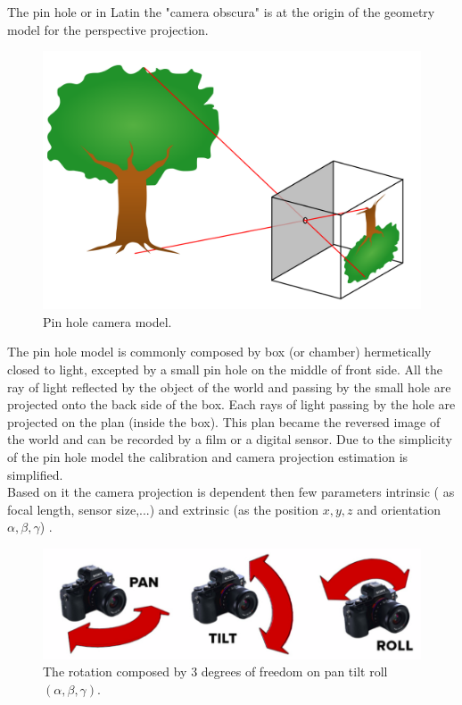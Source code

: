 The pin hole or in Latin the "camera obscura" is at the origin of the geometry model for the perspective projection.\\
\begin{figure}[t!]
\begin{center}
   \includegraphics[width=\linewidth]{img/PinholeCam.png}
  \caption{ Pin hole camera model.}\label{fig:PanTiltRoll}
  \endminipage\hfill
\end{center}
\end{figure} 
 The pin hole model is commonly composed by box (or chamber) hermetically closed to light, excepted by a small pin hole on the middle of front side. All the ray of light reflected by the object of the world and passing by the small hole are projected onto the back side of the box. Each rays of light passing by the hole are  projected on the plan (inside the box). This plan became the reversed image of the world and can be recorded by a film or a digital sensor. 
 Due to the simplicity of the pin hole model the calibration and camera projection estimation is simplified.\\
  Based on it the camera projection is dependent then few parameters intrinsic ( as focal length, sensor size,...) and extrinsic (as the position $x,y,z$ and orientation $\alpha,\beta,\gamma$) . 
  
 
\begin{figure}[t!]
\begin{center}
   \includegraphics[width=\linewidth]{img/PanTiltRoll.png}
  \caption{The rotation composed by 3 degrees of freedom on pan tilt roll$(\alpha,\beta,\gamma)$.}\label{fig:PanTiltRoll}
  \endminipage\hfill
  \end{center}
\end{figure}

